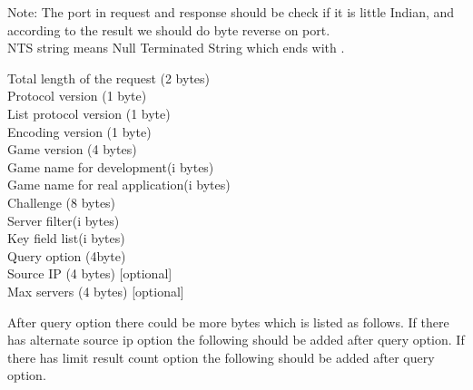 \documentclass[oneside,titlepage,a4paper]{Definition/retrospy} %
\begin{document}
{\color{red}Note}: The port in request and response should be check if it is little Indian, and according to the result we should do byte reverse on port. \\
NTS string means Null Terminated String which ends with .
\ClientRequest
\begin{mybox}[label=Server browser client request]
Total length of the request (2 bytes) \\
 Protocol version (1 byte) \\
 List protocol version (1 byte)\\
 Encoding version (1 byte)\\
 Game version (4 bytes)\\
 Game name for development(i bytes)\\
 Game name for real application(i bytes)\\
 Challenge (8 bytes)\\
 Server filter(i bytes)\\
 Key field list(i bytes)\\
 Query option (4byte) \\
 Source IP (4 bytes) [optional]\\
 Max servers (4 bytes) [optional]
\end{mybox}
After query option there could be more bytes which is listed as follows.
If there has alternate source ip option the following should be added after query option.
If there has limit result count option the following should be added after query option.
\end{document}

